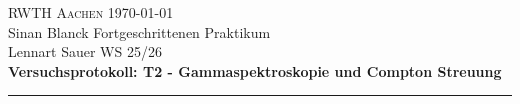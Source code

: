 \documentclass{article}
\begin{document}
\thispagestyle{firstpage}
\begin{center}
    \textsc{RWTH Aachen} \hfill \today\\
    Sinan Blanck \hfill Fortgeschrittenen Praktikum\\
    Lennart Sauer \hfill WS 25/26\\
    \vspace*{0.5cm}
    \textbf{\large Versuchsprotokoll: T2 - Gammaspektroskopie und Compton Streuung}
\end{center}
\hrule
\vspace{1cm}



\newpage



\newpage



\printbibliography
\end{document}
